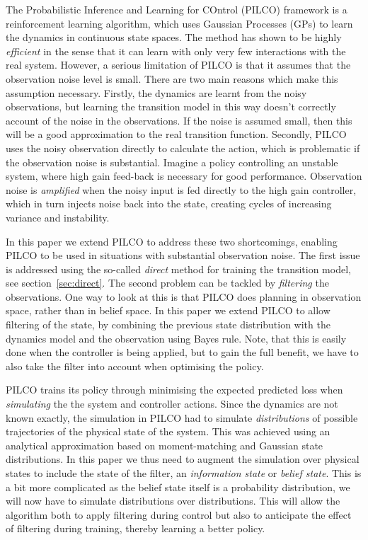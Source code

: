\documentclass{article}
\begin{document}
The Probabilistic Inference and Learning for COntrol (PILCO) \cite{pilco} framework
is a reinforcement learning algorithm, which uses Gaussian Processes (GPs)
to learn the dynamics in continuous state spaces.
The method has shown to be highly \emph{efficient} in the sense that it can
learn with only very few interactions with the real system.
However, a serious limitation of PILCO is that it assumes that the observation noise level is small.
There are two main reasons which make this assumption necessary.
Firstly,
the dynamics are learnt from the noisy observations,
but learning the transition model in this way doesn’t correctly account of the noise in the observations.
If the noise is assumed small, then this will be a good approximation to the real transition function.
%
Secondly,
PILCO uses the noisy observation directly to calculate the action,
which is problematic if the observation noise is substantial.
Imagine a policy controlling an unstable system,
where high gain feed-back is necessary for good performance.
Observation noise is \textit{amplified} when the
noisy input is fed directly to the high gain controller,
which in turn injects noise back into the state,
creating cycles of increasing variance and instability. %

In this paper we extend PILCO to address these two shortcomings,
enabling PILCO to be used in situations with substantial observation noise.
The first issue is addressed using the so-called \emph{direct} method for training the transition model,
see section~\ref{sec:direct}. The second problem can be tackled by \emph{filtering} the observations.
One way to look at this is that PILCO does planning in observation space, rather than in belief space.
In this paper we extend PILCO to allow filtering of the state,
by combining the previous state distribution with the dynamics model and the observation using Bayes rule.
Note, that this is easily done when the controller is being applied, but to gain the full benefit,
we have to also take the filter into account when optimising the policy.

PILCO trains its policy through minimising the expected predicted loss when \emph{simulating}
the the system and controller actions. Since the dynamics are not known exactly,
the simulation in PILCO had to simulate \emph{distributions} of possible trajectories
of the physical state of the system. This was achieved using an analytical approximation based on
moment-matching and Gaussian state distributions. In this paper we thus need to augment the simulation
over physical states to include the state of the filter, an \textit{information state} or \textit{belief state}.
This is a bit more complicated as the belief state itself is a probability distribution,
we will now have to simulate distributions over distributions.
This will allow the algorithm both to apply filtering during control but also to anticipate the
effect of filtering during training, thereby learning a better policy.
\end{document}
